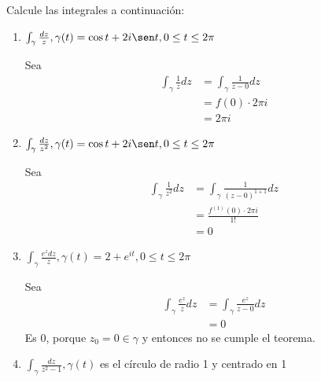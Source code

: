 \begin{problema}
    Calcule las integrales a continuación:
    \begin{enumerate}
        \item $\int_\gamma \frac{d z}{z}, \gamma(t)=\cos t+2 i \sen t, 0 \leq t \leq 2 \pi$
        \begin{sol}
            Sea
            \begin{align*}
                \int_\gamma \frac{1}{z}dz &= \int_\gamma \frac{1}{z-0}dz \\
                &=f(0)\cdot 2\pi i\\
                &= 2\pi i
            \end{align*}
        \end{sol}
        \item $\int_\gamma \frac{d z}{z^2}, \gamma(t)=\cos t+2 i\sen t, 0 \leq t \leq 2 \pi$
        \begin{sol}
            Sea
            \begin{align*}
                \int_\gamma \frac{1}{z^2}dz &= \int_\gamma \frac{1}{(z-0)^{1+1}}dz\\
                &= \frac{f^{(1)}(0)\cdot 2\pi i}{1!}\\
                &= 0
            \end{align*}
        \end{sol}
        \item $\int_\gamma \frac{e^z d z}{z}, \gamma(t)=2+e^{i t}, 0 \leq t \leq 2 \pi$
        \begin{sol}
            Sea
            \begin{align*}
                \int_\gamma \frac{e^z }{z}dz &= \int_\gamma \frac{e^z }{z-0}dz\\
                &= 0
            \end{align*}
            Es 0, porque $z_0=0\in \gamma$ y entonces no se cumple el teorema. 
        \end{sol}
        \item $\int_\gamma \frac{d z}{z^2-1}, \gamma(t)$ es el círculo de radio 1 y centrado en 1
\end{enumerate}
\end{problema}

